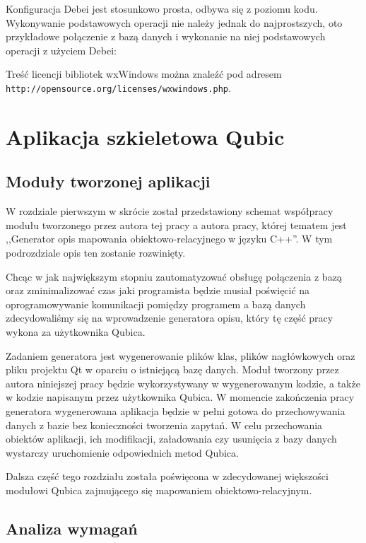 \documentclass[12pt]{report}
\begin{document}
Konfiguracja Debei jest stosunkowo prosta, odbywa się z poziomu kodu. Wykonywanie podstawowych operacji nie należy jednak do najprostszych, oto przykładowe połączenie
z bazą danych i wykonanie na niej podstawowych operacji z użyciem Debei:



Treść licencji bibliotek wxWindows można znaleźć pod adresem {\tt http://open\-source.org/licenses/wxwindows.php}.

\chapter{Aplikacja szkieletowa Qubic} \label{qubic}

\section{Moduły tworzonej aplikacji}

W rozdziale pierwszym w skrócie został przedstawiony schemat współpracy modułu tworzonego przez autora tej pracy a autora pracy, której tematem jest ,,Generator opis
mapowania obiektowo-relacyjnego w języku C++''. W tym podrozdziale opis ten zostanie rozwinięty.

Chcąc w jak największym stopniu zautomatyzować obsługę połączenia z bazą oraz zminimalizować czas jaki programista będzie musiał poświęcić na oprogra\-mowywanie
komunikacji pomiędzy programem a bazą danych zdecydowaliśmy się na wprowadzenie generatora opisu, który tę część pracy wykona za użytkownika Qubica.

Zadaniem generatora jest wygenerowanie plików klas, plików nagłówkowych oraz pliku projektu Qt w oparciu o istniejącą bazę danych. Moduł tworzony przez autora niniejszej
pracy będzie wykorzystywany w wygenerowanym kodzie, a także w kodzie napisanym przez użytkownika Qubica. W momencie zakończenia pracy generatora wygenerowana
aplikacja będzie w pełni gotowa do przechowywania danych z bazie bez konieczności tworzenia zapytań. W celu przechowania obiektów aplikacji, ich modifikacji, załadowania 
czy usunięcia z bazy danych wystarczy uruchomienie odpowiednich metod Qubica.

Dalsza część tego rozdziału została poświęcona w zdecydowanej większości modułowi Qubica zajmującego się mapowaniem obiektowo-relacyjnym.

\section{Analiza wymagań}
\end{document}
